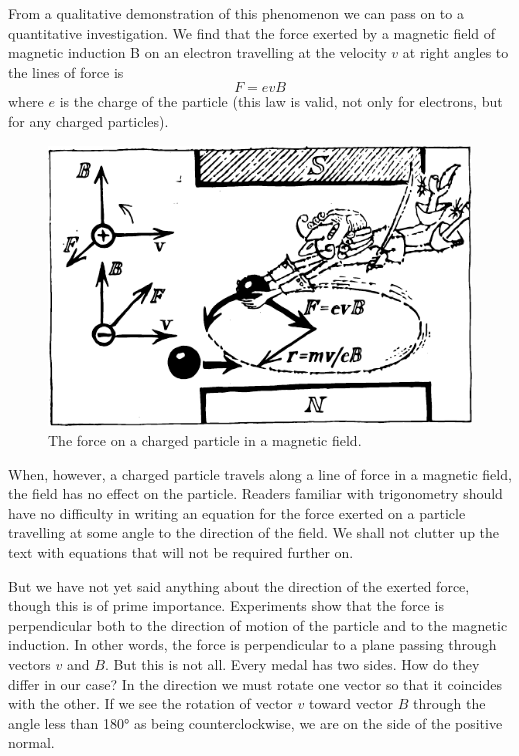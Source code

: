 From a qualitative demonstration of this phenomenon we can pass on to a quantitative investigation. We find that the force exerted by a magnetic field of magnetic induction B on an electron travelling at the velocity $v$ at right angles to the lines of force is
\begin{equation*}%
F = e v B
\label{lorentz-force}
\end{equation*}
where $e$ is the charge of the particle (this law is valid, not only for electrons, but for any charged particles). 
\begin{figure}[!ht]
\centering
\includegraphics[width=\textwidth]{figures/fig-03-03.pdf}
\caption{The force on a charged particle in a magnetic field.}
\label{fig-3.3}
\end{figure}
When, however, a charged particle travels along a line of force in a magnetic field, the field has no effect on the particle. Readers familiar with trigonometry should have no difficulty in writing an equation for the force exerted on a particle travelling at some angle to the direction of the field. We shall not clutter up the text with equations that will not be required further on. 

But we have not yet said anything about the direction of the exerted force, though this is of prime importance. Experiments show that the force is perpendicular both to the direction of motion of the particle and to the magnetic induction. In other words, the force is perpendicular to a plane passing through vectors $v$ and $B$. But this is not all. Every medal has two sides. How do they differ in our case? In the direction we must rotate one vector so that it coincides with the other. If we see the rotation of vector $v$ toward vector $B$ through the angle less than \ang{180} as being counterclockwise, we are on the side of the positive normal.

